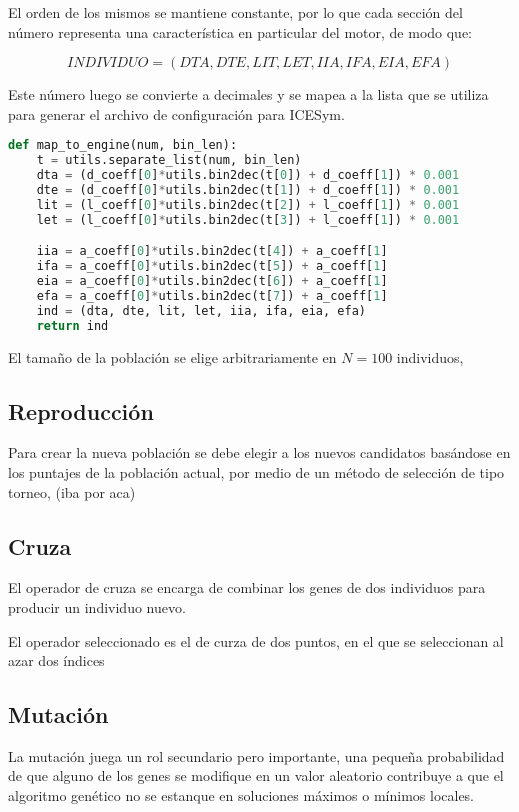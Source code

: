 El orden de los mismos se mantiene constante, por lo que cada sección del número
representa una característica en particular del motor, de modo que:

\begin{equation}
    INDIVIDUO = (DTA, DTE, LIT, LET, IIA, IFA, EIA, EFA) \nonumber
\end{equation}

Este número luego se convierte a decimales y se mapea a la lista que se utiliza
para generar el archivo de configuración para ICESym.
%

\begin{lstlisting}[language=Python]
def map_to_engine(num, bin_len):
    t = utils.separate_list(num, bin_len)
    dta = (d_coeff[0]*utils.bin2dec(t[0]) + d_coeff[1]) * 0.001
    dte = (d_coeff[0]*utils.bin2dec(t[1]) + d_coeff[1]) * 0.001
    lit = (l_coeff[0]*utils.bin2dec(t[2]) + l_coeff[1]) * 0.001
    let = (l_coeff[0]*utils.bin2dec(t[3]) + l_coeff[1]) * 0.001

    iia = a_coeff[0]*utils.bin2dec(t[4]) + a_coeff[1]
    ifa = a_coeff[0]*utils.bin2dec(t[5]) + a_coeff[1]
    eia = a_coeff[0]*utils.bin2dec(t[6]) + a_coeff[1]
    efa = a_coeff[0]*utils.bin2dec(t[7]) + a_coeff[1]
    ind = (dta, dte, lit, let, iia, ifa, eia, efa)
    return ind
\end{lstlisting}

El tamaño de la población se elige arbitrariamente en $N=100$ individuos, 

\subsection{Reproducción}

Para crear la nueva población se debe elegir a los nuevos candidatos basándose
en los puntajes de la población actual, por medio de un método de selección de
tipo torneo, (iba por aca)
%


\subsection{Cruza}
%
El operador de cruza se encarga de combinar los genes de dos individuos para
producir un individuo nuevo.

El operador seleccionado es el de curza de dos puntos, en el que se seleccionan
al azar dos índices


\subsection{Mutación}
%
La mutación juega un rol secundario pero importante, una pequeña probabilidad
de que alguno de los genes se modifique en un valor aleatorio contribuye a que
el algoritmo genético no se estanque en soluciones máximos o mínimos locales.

